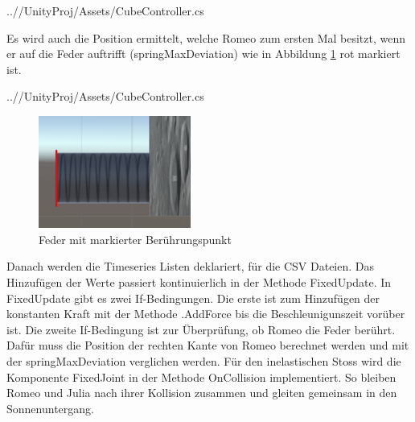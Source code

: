 \documentclass[../main.tex]{subfiles}
\begin{document}
    \begin{lstinputlisting}[label={lst:graphInelastic}, firstline=49, lastline=50]
    {..//UnityProj/Assets/CubeController.cs}
    \end{lstinputlisting}
    Es wird auch die Position ermittelt, welche Romeo zum ersten Mal besitzt, wenn er auf die Feder auftrifft (springMaxDeviation) wie in Abbildung \ref{fig:2Lab_SpringDeviation} rot markiert ist.
    \begin{lstinputlisting}[label={lst:graphInelastic}, firstline=51, lastline=52]
    {..//UnityProj/Assets/CubeController.cs}
    \end{lstinputlisting}


    \begin{figure}[H]
        \begin{center}
            \centerline{\includegraphics[width=50mm]{./images/2Lab_SpringDeviation.PNG}}
            \caption{Feder mit markierter Berührungspunkt}
            \label{fig:2Lab_SpringDeviation}
        \end{center}
    \end{figure}
    Danach werden die Timeseries Listen deklariert, für die CSV Dateien. Das Hinzufügen der Werte passiert kontinuierlich in der Methode FixedUpdate.
    \newline
    In FixedUpdate gibt es zwei If-Bedingungen. Die erste ist zum Hinzufügen der konstanten Kraft mit der Methode .AddForce bis die Beschleunigunszeit vorüber ist.
    Die zweite If-Bedingung ist zur Überprüfung, ob Romeo die Feder berührt. Dafür muss die Position der rechten Kante von Romeo berechnet werden und mit der
    springMaxDeviation verglichen werden.
    Für den inelastischen Stoss wird die Komponente FixedJoint in der Methode OnCollision implementiert. So bleiben Romeo und Julia  nach ihrer
    Kollision zusammen und gleiten gemeinsam in den Sonnenuntergang.
\end{document}

